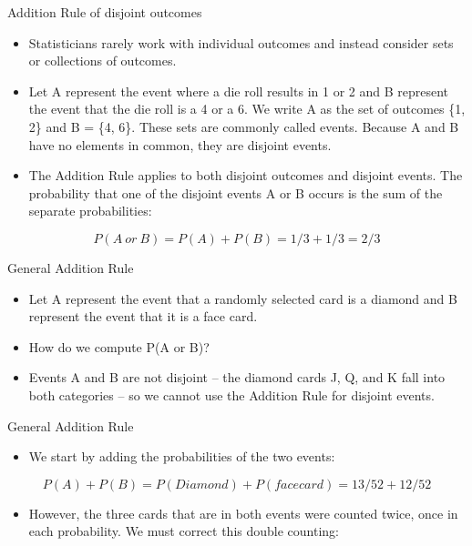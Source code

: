 \documentclass[
  ignorenonframetext,
]{beamer}
\providecommand{\tightlist}{%
  \setlength{\itemsep}{0pt}\setlength{\parskip}{0pt}}
\begin{document}
\begin{frame}{Addition Rule of disjoint outcomes}
\protect\hypertarget{addition-rule-of-disjoint-outcomes-1}{}

\begin{itemize}
\item
  Statisticians rarely work with individual outcomes and instead
  consider sets or collections of outcomes.
\item
  Let A represent the event where a die roll results in 1 or 2 and B
  represent the event that the die roll is a 4 or a 6. We write A as the
  set of outcomes \{1, 2\} and B = \{4, 6\}. These sets are commonly
  called events. Because A and B have no elements in common, they are
  disjoint events.
\item
  The Addition Rule applies to both disjoint outcomes and disjoint
  events. The probability that one of the disjoint events A or B occurs
  is the sum of the separate probabilities:
\end{itemize}

\[P (A \ or \ B) = P (A) + P (B) = 1/3 + 1/3 = 2/3\]

\end{frame}

\begin{frame}{General Addition Rule}
\protect\hypertarget{general-addition-rule}{}

\begin{itemize}
\item
  Let A represent the event that a randomly selected card is a diamond
  and B represent the event that it is a face card.
\item
  How do we compute P(A or B)?
\item
  Events A and B are not disjoint -- the diamond cards J, Q, and K fall
  into both categories -- so we cannot use the Addition Rule for
  disjoint events.
\end{itemize}

\end{frame}

\begin{frame}{General Addition Rule}
\protect\hypertarget{general-addition-rule-1}{}

\begin{itemize}
\tightlist
\item
  We start by adding the probabilities of the two events:
\end{itemize}

\[P(A) + P(B) = P(Diamond) + P(face card) = 13/52 + 12/52\]

\begin{itemize}
\tightlist
\item
  However, the three cards that are in both events were counted twice,
  once in each probability. We must correct this double counting:
\end{itemize}

\end{frame}
\end{document}

